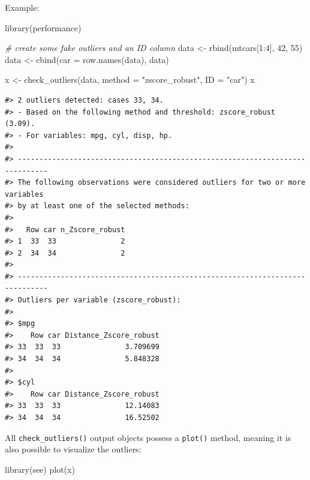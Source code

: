 \documentclass[
]{article}
\newenvironment{Shaded}{\begin{snugshade}}{\end{snugshade}}
\newcommand{\AttributeTok}[1]{\textcolor[rgb]{0.77,0.63,0.00}{#1}}
\newcommand{\CommentTok}[1]{\textcolor[rgb]{0.56,0.35,0.01}{\textit{#1}}}
\newcommand{\DecValTok}[1]{\textcolor[rgb]{0.00,0.00,0.81}{#1}}
\newcommand{\FunctionTok}[1]{\textcolor[rgb]{0.00,0.00,0.00}{#1}}
\newcommand{\NormalTok}[1]{#1}
\newcommand{\OtherTok}[1]{\textcolor[rgb]{0.56,0.35,0.01}{#1}}
\newcommand{\SpecialCharTok}[1]{\textcolor[rgb]{0.00,0.00,0.00}{#1}}
\newcommand{\StringTok}[1]{\textcolor[rgb]{0.31,0.60,0.02}{#1}}
\begin{document}
Example:

\begin{Shaded}
\begin{Highlighting}[]
\FunctionTok{library}\NormalTok{(performance)}

\CommentTok{\# create some fake outliers and an ID column}
\NormalTok{data }\OtherTok{\textless{}{-}} \FunctionTok{rbind}\NormalTok{(mtcars[}\DecValTok{1}\SpecialCharTok{:}\DecValTok{4}\NormalTok{], }\DecValTok{42}\NormalTok{, }\DecValTok{55}\NormalTok{)}
\NormalTok{data }\OtherTok{\textless{}{-}} \FunctionTok{cbind}\NormalTok{(}\AttributeTok{car =} \FunctionTok{row.names}\NormalTok{(data), data)}

\NormalTok{x }\OtherTok{\textless{}{-}} \FunctionTok{check\_outliers}\NormalTok{(data, }\AttributeTok{method =} \StringTok{"zscore\_robust"}\NormalTok{, }\AttributeTok{ID =} \StringTok{"car"}\NormalTok{)}
\NormalTok{x}
\end{Highlighting}
\end{Shaded}

\begin{verbatim}
#> 2 outliers detected: cases 33, 34.
#> - Based on the following method and threshold: zscore_robust (3.09).
#> - For variables: mpg, cyl, disp, hp.
#> 
#> -----------------------------------------------------------------------------
#> The following observations were considered outliers for two or more variables 
#> by at least one of the selected methods: 
#> 
#>   Row car n_Zscore_robust
#> 1  33  33               2
#> 2  34  34               2
#> 
#> -----------------------------------------------------------------------------
#> Outliers per variable (zscore_robust): 
#> 
#> $mpg
#>    Row car Distance_Zscore_robust
#> 33  33  33               3.709699
#> 34  34  34               5.848328
#> 
#> $cyl
#>    Row car Distance_Zscore_robust
#> 33  33  33               12.14083
#> 34  34  34               16.52502
\end{verbatim}

All \texttt{check\_outliers()} output objects possess a \texttt{plot()} method, meaning it is also possible to visualize the outliers:



\begin{Shaded}
\begin{Highlighting}[]
\FunctionTok{library}\NormalTok{(see)}
\FunctionTok{plot}\NormalTok{(x)}
\end{Highlighting}
\end{Shaded}
\end{document}
